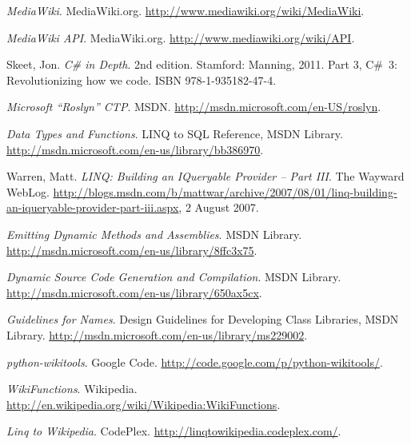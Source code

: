 
\def\bibname{Bibliography}
\begin{thebibliography}{12}
\addcontentsline{toc}{chapter}{\bibname}


 \emph{MediaWiki}.
 MediaWiki.org.
 \url{http://www.mediawiki.org/wiki/MediaWiki}.

 \emph{MediaWiki API}.
 MediaWiki.org.
 \url{http://www.mediawiki.org/wiki/API}.
 
  {\sc Skeet,} Jon.
  \emph{C\# in Depth}.
  2nd edition.
  Stamford: Manning, 2011.
  Part 3, C\#~3: Revolutionizing how we code.
  ISBN 978-1-935182-47-4.
  
 \emph{Microsoft “Roslyn” CTP}.
 MSDN.
 \url{http://msdn.microsoft.com/en-US/roslyn}.
 
 \emph{Data Types and Functions}.
 LINQ to SQL Reference, MSDN Library.
 \url{http://msdn.microsoft.com/en-us/library/bb386970}.

 {\sc Warren}, Matt.
 \emph{LINQ: Building an IQueryable Provider -- Part III}.
 The Wayward WebLog.
 \url{http://blogs.msdn.com/b/mattwar/archive/2007/08/01/linq-building-an-iqueryable-provider-part-iii.aspx},
 2 August 2007.
 
 \emph{Emitting Dynamic Methods and Assemblies}.
 MSDN Library.
 \url{http://msdn.microsoft.com/en-us/library/8ffc3x75}.

 \emph{Dynamic Source Code Generation and Compilation}.
 MSDN Library.
 \url{http://msdn.microsoft.com/en-us/library/650ax5cx}.
 
 \emph{Guidelines for Names}.
 Design Guidelines for Developing Class Libraries, MSDN Library.
 \url{http://msdn.microsoft.com/en-us/library/ms229002}.
 
 \emph{python-wikitools}.
 Google Code.
 \url{http://code.google.com/p/python-wikitools/}.
 
 \emph{WikiFunctions}.
 Wikipedia.
 \url{http://en.wikipedia.org/wiki/Wikipedia:WikiFunctions}.
 
 \emph{Linq to Wikipedia}.
 CodePlex.
 \url{http://linqtowikipedia.codeplex.com/}.
 
\end{thebibliography}